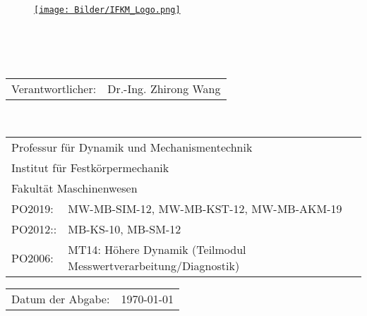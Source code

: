 \thispagestyle{empty}					%

\begin{figure}[!htb]
\vspace*{-1.0cm}
\begin{addmargin}{-0.1\linewidth}
\href{https://bildungsportal.sachsen.de/opal/auth/RepositoryEntry/1980137473}{\texttt{[image: Bilder/IFKM\_Logo.png]}}
\end{addmargin}
\end{figure}



\begin{center}
\vspace{4.5cm}
{\fontsize{28}{28} }\\
\vspace{0.5cm}
{\fontsize{28}{28} }\\
\vspace{0.5cm}
{\fontsize{28}{28} }\\
\vspace{5.5cm}
    
\end{center}
\begin{flushleft}
\begin{tabular}{p{3.5cm} l}
Verantwortlicher: & Dr.-Ing. Zhirong Wang\\
\end{tabular}\\
\vspace{1.0cm}

\begin{tabular}{p{3.5cm} l}
\multicolumn{2}{l}{Professur für Dynamik und Mechanismentechnik}\\
\multicolumn{2}{l}{Institut für Festkörpermechanik}\\
\multicolumn{2}{l}{Fakultät Maschinenwesen}\\
PO2019: & MW-MB-SIM-12, MW-MB-KST-12, MW-MB-AKM-19\\
PO2012:: & MB-KS-10,  MB-SM-12\\
PO2006: &  MT14: Höhere Dynamik (Teilmodul Messwertverarbeitung/Diagnostik)\\
\end{tabular}
\vspace{1.0cm}


\begin{tabular}{p{3.5cm} l}
Datum der Abgabe: & \today\\			%
\end{tabular}
\end{flushleft}
